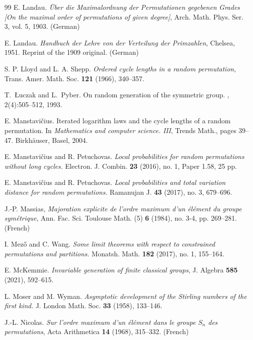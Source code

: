 \documentclass[10pt]{article}
\renewcommand{\(}{\left(}
\renewcommand{\)}{\right)}
\begin{document}
\begin{thebibliography}{99}
 {\sc E. Landau}.
\emph{\" Uber die Maximalordnung der Permutationen gegebenen Grades [On the maximal order of permutations of given degree]}, 
Arch. Math. Phys. Ser. 3, vol. 5, 1903. (German)

 {\sc E. Landau}.
\emph{Handbuch der Lehre von der Verteilung der Primzahlen},
Chelsea, 1951.  Reprint of the 1909 original. (German)



{\sc S. P. Lloyd and  L. A. Shepp}.
\emph{Ordered cycle lengths in a random permutation},
Trans. Amer. Math. Soc. {\bf 121} (1966), 340--357. 

{\sc T.~{\L}uczak and L.~Pyber}.
\newblock On random generation of the symmetric group.
, 2(4):505--512, 1993.

{\sc E. Manstavi\v{c}ius}.
\newblock Iterated logarithm laws and the cycle lengths of a random
  permutation.
\newblock In {\em Mathematics and computer science. {III}}, Trends Math., pages
  39--47. Birkh\"{a}user, Basel, 2004.

{\sc E.  Manstavi\v{c}ius and R. Petuchovas}.
\emph{Local probabilities for random permutations without long cycles.} Electron. J. Combin. {\bf 23} (2016), no. 1, Paper 1.58, 25 pp.

{\sc E.  Manstavi\v{c}ius and R. Petuchovas}.
\emph{Local probabilities and total variation distance for random permutations.} Ramanujan J. {\bf 43} (2017), no. 3, 679--696.


{\sc J.-P. Massias}, \emph{Majoration explicite de l'ordre maximum d'un {\' e}l{\' e}ment du groupe sym{\' e}trique}, Ann. Fac. Sci. Toulouse Math. (5) {\bf 6} (1984), no. 3-4, pp. 269--281. (French)


{\sc I. Mez\H o and C. Wang}.
\emph{Some limit theorems with respect to constrained permutations and partitions.}
Monatsh. Math. {\bf 182} (2017), no. 1, 155--164. 
%

{\sc E. McKemmie}.
\emph{Invariable generation of finite classical groups},
 J. Algebra {\bf 585} (2021), 592--615. 


{\sc L. Moser and M. Wyman}.
\emph{Asymptotic development of the Stirling numbers of the first kind.}
J. London Math. Soc. {\bf 33} (1958), 133--146.

{\sc J.-L. Nicolas}. \emph{Sur l'ordre maximum d'un {\' e}l{\' e}ment dans le groupe $S_n$ des permutations}, Acta Arithmetica {\bf 14} (1968), 315--332. (French)


\end{thebibliography}
\end{document}
